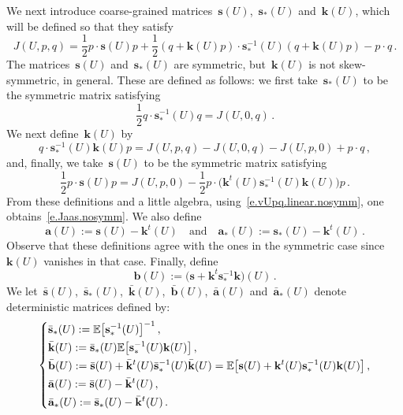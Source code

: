 \documentclass[11pt,twoside]{article} %
\numberwithin{equation}{section}
\theoremstyle{definition}
\let\originalleft\left
\let\originalright\right
\renewcommand{\left}{\mathopen{}\mathclose\bgroup\originalleft}
\renewcommand{\right}{\aftergroup\egroup\originalright}
\renewcommand{\b}{\ensuremath{\mathbf{b}}}
\newcommand{\s}{\mathbf{s}}
\renewcommand{\a}{\mathbf{a}}
\renewcommand{\k}{\mathbf{k}}
\newcommand{\ahom}{\bar{\a}}
\newcommand{\bhom}{\bar{\mathbf{b}}}
\newcommand{\shom}{\bar{\mathbf{s}}}
\newcommand{\khom}{\bar{\mathbf{k}}}
\newcommand{\E}{\mathbb{E}}
\begin{document}
We next introduce coarse-grained matrices~$\s(U)$,~$\s_*(U)$ and~$\k(U)$, which will be defined so that they satisfy 
\begin{equation}
\label{e.Jaas.nosymm}
J(U,p,q) =
\frac 12p \cdot \s(U)p 
+ \frac 12 (q+\k(U) p) \cdot \s_*^{-1}(U) (q+\k(U) p) 
- p \cdot q \,.
\end{equation}
The matrices~$\s(U)$ and~$\s_*(U)$ are symmetric, but~$\k(U)$ is not skew-symmetric, in general.
These are defined as follows: we first take~$\s_*(U)$ to be the symmetric matrix satisfying 
\begin{equation}
\label{e.sastU.def}
\frac 12 q\cdot \s_*^{-1}(U)  q = J(U,0,q)\,.
\end{equation}
We next define~$\k(U)$ by
\begin{equation}
\label{e.mU.def}
q \cdot \s_*^{-1}(U) \k(U) p =
J(U,p,q) - J(U,0,q) - J(U,p,0) +p \cdot q \,,
\end{equation}
and, finally, we take~$\s(U)$ to be the symmetric matrix satisfying
\begin{equation}
\label{e.sU.def}
\frac 12 p \cdot \s(U) p = 
 J(U,p,0) - \frac12p \cdot \bigl ( \k^t(U) \s_*^{-1}(U) \k(U)  \bigr ) p 	
 \,.
\end{equation}
From these definitions and a little algebra, using~\eqref{e.vUpq.linear.nosymm}, one obtains~\eqref{e.Jaas.nosymm}.
We also define
\begin{equation}
\label{e.def.a.nosymm}
\a(U) := \s(U) - \k^t(U) 
\quad \mbox{and} \quad
\a_*(U) :=  \s_*(U)  - \k^t(U)\,.
\end{equation}
Observe that these definitions agree with the ones in the symmetric case since~$\k(U)$ vanishes in that case. Finally, define
\begin{equation*}
\b(U) := \bigl ( \s + \k^t\s_*^{-1}\k\bigr )(U) 
\,.
\end{equation*}
We let~$\shom(U)$,~$\shom_*(U)$,~$\khom(U)$,~$\bhom(U)$,~$\ahom(U)$ and~$\ahom_*(U)$ denote deterministic matrices defined by:
\begin{equation}
\label{e.meet.the.homs}
\left\{
\begin{aligned}
& \shom_*(U) := \E \bigl[ \s_*^{-1}(U) \bigr]^{-1} \,, 
\\ & 
\khom(U) 
:= \shom_*(U)  \E \bigl[ \s_*^{-1}(U) \k(U) \bigr] \,, 
\\ & 
\bhom(U) := \shom(U) + \khom^t(U) \shom_*^{-1}(U) \khom(U)
=
\E \bigl[ \s(U) + \k^t(U) \s_*^{-1}(U) \k(U) \bigr]\,,
\\ & 
\ahom (U) :=  \shom(U) - \khom^t(U)\,,
\\ & 
\ahom_* (U) :=  \shom_*(U) -  \khom^t(U)\,.
\end{aligned}
\right.
\end{equation}
\end{document}
